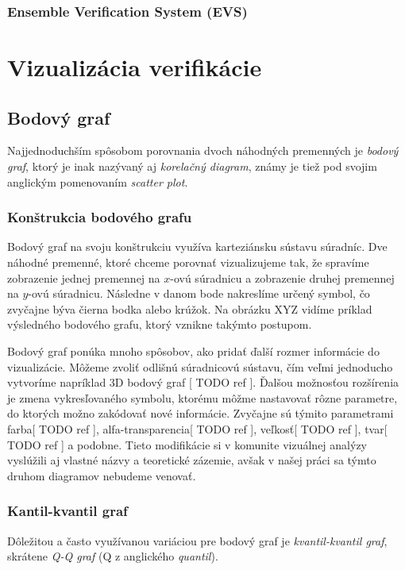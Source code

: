 \subsubsection[EVS]{Ensemble Verification System (EVS)}



\section{Vizualizácia verifikácie}

\subsection{Bodový graf}
Najjednoduchším spôsobom porovnania dvoch náhodných premenných je \textit{bodový graf}, ktorý je inak nazývaný aj \textit{korelačný diagram}, známy je tiež pod svojim anglickým pomenovaním \textit{scatter plot}.



\subsubsection{Konštrukcia bodového grafu}
Bodový graf na svoju konštrukciu využíva karteziánsku sústavu súradníc. Dve náhodné premenné, ktoré chceme porovnať vizualizujeme tak, že spravíme zobrazenie jednej premennej na $ x $-ovú súradnicu a zobrazenie druhej premennej na $ y $-ovú súradnicu. Následne v danom bode nakreslíme určený symbol, čo zvyčajne býva čierna bodka alebo krúžok. 
Na obrázku XYZ vidíme príklad výsledného bodového grafu, ktorý vznikne takýmto postupom.

Bodový graf ponúka mnoho spôsobov, ako pridať ďalší rozmer informácie do vizualizácie. Môžeme zvoliť odlišnú súradnicovú sústavu, čím veľmi jednoducho vytvoríme napríklad 3D bodový graf [ TODO ref ]. Ďalšou možnosťou rozšírenia je zmena vykresľovaného symbolu, ktorému môžme nastavovať rôzne parametre, do ktorých možno zakódovať nové informácie. Zvyčajne sú týmito parametrami farba[ TODO ref ], alfa-transparencia[ TODO ref ], veľkosť[ TODO ref ], tvar[ TODO ref ] a podobne. Tieto modifikácie si v komunite vizuálnej analýzy vyslúžili aj vlastné názvy a teoretické zázemie, avšak v našej práci sa týmto druhom diagramov nebudeme venovať.

\subsubsection{Kantil-kvantil graf}
Dôležitou a často využívanou variáciou pre bodový graf je \textit{kvantil-kvantil graf}, skrátene \textit{Q-Q graf} (Q z anglického \textit{quantil}).

